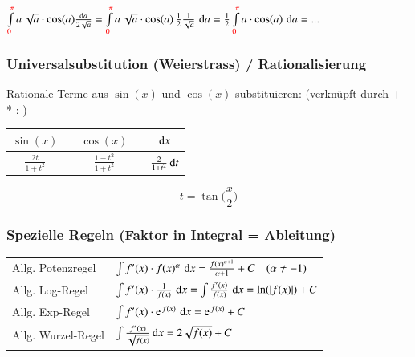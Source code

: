 $\int \limits_{{\color{red}0}}^{{\color{red}\pi}} a \, \sqrt{a} \cdot \cos(a) \frac{\mathop{} \! \mathrm{d} a}{2 \sqrt{a}} 
= \int \limits_{{\color{red}0}}^{{\color{red}\pi}} a \, \sqrt{a} \cdot \cos(a) \, \frac{1}{2} \frac{1}{\sqrt{a}} \, \mathop{} \! \mathrm{d} a 
= \frac{1}{2} \int \limits_{{\color{red}0}}^{{\color{red}\pi}} a \cdot \cos(a) \, \mathop{} \! \mathrm{d} a = ... $


\subsubsection{Universalsubstitution (Weierstrass) / Rationalisierung}

Rationale Terme aus $\sin(x)$ und $\cos(x)$ substituieren: (verknüpft durch +  -  *  : )\vspace{1em}

\begin{minipage}{0.55\columnwidth}
    \begin{tabular}{ c cc cc}
            \toprule
            $\sin(x)$               & & $\cos(x)$                 & & $\mathop{} \! \mathrm{d} x$                     \\
            \midrule
            $\frac{2 t}{1 + t^2}$   & & $\frac{1 - t^2}{1 + t^2}$ & & $\frac{2}{1 + t^2} \mathop{} \! \mathrm{d} t$   \\
            \bottomrule
    \end{tabular}
\end{minipage}
\begin{minipage}{0.35\columnwidth}
    \[\boxed{t = \tan \Big( \frac{x}{2} \Big)}\]
    \begin{center}
    \end{center}
\end{minipage}


\subsubsection{Spezielle Regeln (Faktor in Integral = Ableitung)}		

\vspace{-0.2cm}

\renewcommand{\arraystretch}{2.3}
\begin{tabular}{ll}
    Allg. Potenzregel   & $\int f'(x) \cdot f(x)^{\alpha} \, \mathop{} \! \mathrm{d} x = \frac{f(x)^{\alpha + 1}}{\alpha + 1} + C \quad   (\alpha \neq -1)$   \\
    Allg. Log-Regel     & $\int f'(x) \cdot \frac{1}{f(x)} \, \mathop{} \! \mathrm{d} x = \int \frac{f'(x)}{f(x)} \, \mathop{} \! \mathrm{d} x = \ln(\vert f(x) \vert ) + C$    \\
    Allg. Exp-Regel     & $\int f'(x) \cdot \e^{f(x)} \, \diff x = \e^{f(x)} + C$\\
    Allg. Wurzel-Regel  & $\int \frac{f'(x)}{\sqrt{f(x)}} \mathop{} \! \mathrm{d} x = 2\sqrt{f(x)} + C$
\end{tabular}				
\renewcommand{\arraystretch}{1}


